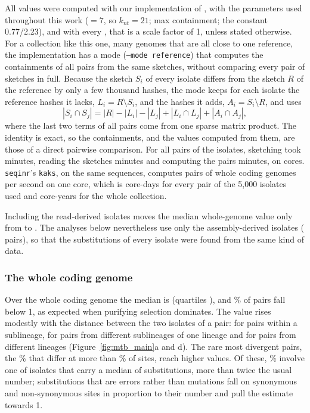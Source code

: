 All values were computed with our implementation of \method, with the parameters used throughout
this work (\kaa{}$= 7$, so $k_{nt} = 21$; max containment; the constant 0.77/2.23), and with every
\kmer, that is a scale factor of 1, unless stated otherwise. For a collection like this one, many
genomes that are all close to one reference, the implementation has a mode
(\texttt{--mode reference}) that computes the containments of all pairs from the same sketches,
without comparing every pair of sketches in full. Because the sketch $S_i$ of every isolate differs
from the sketch $R$ of the reference by only a few thousand hashes, the mode keeps for each isolate
the reference hashes it lacks, $L_i = R \setminus S_i$, and the hashes it adds,
$A_i = S_i \setminus R$, and uses
\[
|S_i \cap S_j| = |R| - |L_i| - |L_j| + |L_i \cap L_j| + |A_i \cap A_j| ,
\]
where the last two terms of all pairs come from one sparse matrix product. The identity is exact, so
the containments, and the \dnds values computed from them, are those of a direct pairwise comparison.
For all \mtbFullPairs{} pairs of the \mtbAllIsolates{} isolates, sketching took \mtbSketchMinutes{}
minutes, reading the sketches \mtbFullLoadMinutes{} minutes and computing the pairs
\mtbFullPairsMinutes{} minutes, on \mtbCores{} cores. \texttt{seqinr}'s \texttt{kaks}, on the same
sequences, computes \mtbSeqinrPairsPerSecond{} pairs of whole coding genomes per second on one core,
which is \mtbSeqinrFiveThousandCoreDays{} core-days for every pair of the 5,000 isolates
\citet{gan2025} used and \mtbSeqinrAllCoreYears{} core-years for the whole collection.

Including the read-derived isolates moves the median whole-genome value only from
\mtbMedianWhole{} to \mtbFullMedian{}. The analyses below nevertheless use only the
\mtbAssemblyIsolates{} assembly-derived isolates (\mtbPairs{} pairs), so that the substitutions of
every isolate were found from the same kind of data.

\subsubsection*{The whole coding genome}

Over the whole coding genome the median is \mtbMedianWhole{} (quartiles \mtbQuartilesWhole{}), and
\mtbBelowOne\% of pairs fall below 1, as expected when purifying selection dominates. The value rises
modestly with the distance between the two isolates of a pair: \mtbMedianSameSublineage{} for pairs
within a sublineage, \mtbMedianSameLineage{} for pairs from different sublineages of one lineage and
\mtbMedianDifferentLineage{} for pairs from different lineages (Figure~\ref{fig:mtb_main}a and d).
The rare most divergent pairs, the \mtbTailShare\% that differ at more than \mtbTailThreshold\% of
sites, reach higher values. Of these, \mtbTailWithOutlier\% involve one of \mtbTailIsolates{}
isolates that carry a median of \mtbTailSubstitutions{} substitutions, more than twice the usual
number; substitutions that are errors rather than mutations fall on synonymous and non-synonymous
sites in proportion to their number and pull the estimate towards 1.

